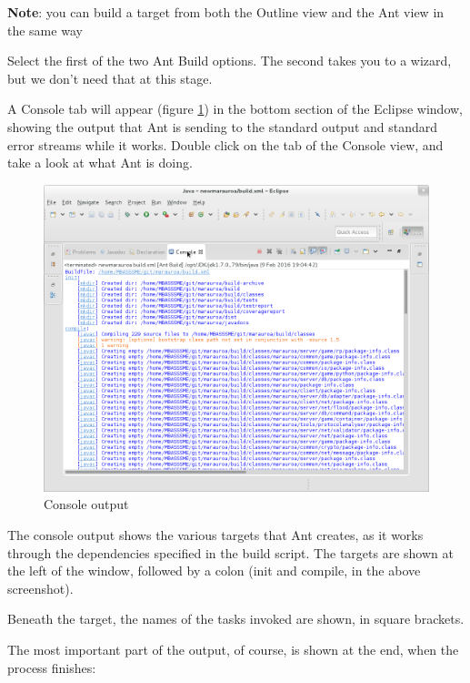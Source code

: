 \documentclass[
]{book}
\begin{document}
\textbf{Note}: you can build a target from both the Outline view and the Ant view in the same way

Select the first of the two Ant Build options. The second takes you to a wizard, but we don't need that at this stage.

A Console tab will appear (figure \ref{fig:consoleOut-fig}) in the bottom section of the Eclipse window, showing the output that Ant is sending to the standard output and standard error streams while it works. Double click on the tab of the Console view, and take a look at what Ant is doing.

\begin{figure}

{\centering \includegraphics[width=1\linewidth]{images/2.1consoleOut} 

}

\caption{Console output}\label{fig:consoleOut-fig}
\end{figure}

The console output shows the various targets that Ant creates, as it works through the dependencies specified in the build script. The targets are shown at the left of the window, followed by a colon (init and compile, in the above screenshot).

Beneath the target, the names of the tasks invoked are shown, in square brackets.

The most important part of the output, of course, is shown at the end, when the process finishes:
\end{document}
